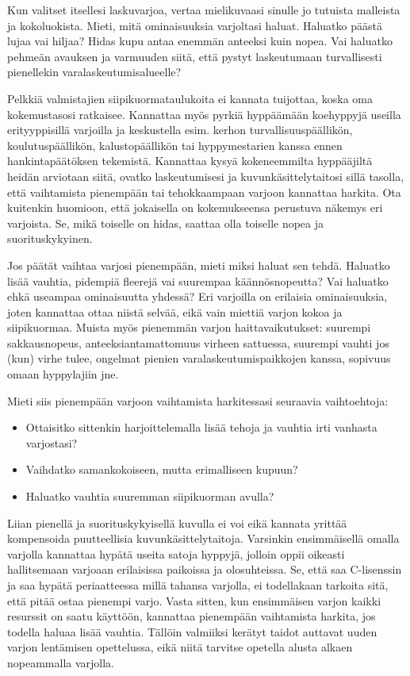 
Kun valitset itsellesi laskuvarjoa, vertaa mielikuvaasi sinulle jo tutuista malleista ja kokoluokista. Mieti, mitä ominaisuuksia varjoltasi haluat. Haluatko päästä lujaa vai hiljaa? Hidas kupu antaa enemmän anteeksi kuin nopea. Vai haluatko pehmeän avauksen ja varmuuden siitä, että pystyt laskeutumaan turvallisesti pienellekin varalaskeutumisalueelle? 


Pelkkiä valmistajien siipikuormataulukoita ei kannata tuijottaa, koska oma kokemustasosi ratkaisee. Kannattaa myös pyrkiä hyppäämään koehyppyjä useilla erityyppisillä varjoilla ja keskustella esim. kerhon turvallisuuspäällikön, koulutuspäällikön, kalustopäällikön tai hyppymestarien kanssa ennen hankintapäätöksen tekemistä. Kannattaa kysyä kokeneemmilta hyppääjiltä heidän arviotaan siitä, ovatko laskeutumisesi ja kuvunkäsittelytaitosi sillä tasolla, että vaihtamista pienempään tai tehokkaampaan varjoon kannattaa harkita. Ota kuitenkin huomioon, että jokaisella on kokemukseensa perustuva näkemys eri varjoista. Se, mikä toiselle on hidas, saattaa olla toiselle nopea ja suorituskykyinen. 


Jos päätät vaihtaa varjosi pienempään, mieti miksi haluat sen tehdä. Haluatko lisää vauhtia, pidempiä fleerejä vai suurempaa käännösnopeutta? Vai haluatko ehkä useampaa ominaisuutta yhdessä? Eri varjoilla on erilaisia ominaisuuksia, joten kannattaa ottaa niistä selvää, eikä vain miettiä varjon kokoa ja siipikuormaa. Muista myös pienemmän varjon haittavaikutukset: suurempi sakkausnopeus, anteeksiantamattomuus virheen sattuessa, suurempi vauhti jos (kun) virhe tulee, ongelmat pienien varalaskeutumispaikkojen kanssa, sopivuus omaan hyppylajiin jne. 


Mieti siis pienempään varjoon vaihtamista harkitessasi seuraavia vaihtoehtoja:  

\begin{itemize}
\item  Ottaisitko sittenkin harjoittelemalla lisää tehoja ja vauhtia irti vanhasta varjostasi? 
\item  Vaihdatko samankokoiseen, mutta erimalliseen kupuun? 
\item  Haluatko vauhtia suuremman siipikuorman avulla? 
\end{itemize}

Liian pienellä ja suorituskykyisellä kuvulla ei voi eikä kannata yrittää kompensoida puutteellisia kuvunkäsittelytaitoja. Varsinkin ensimmäisellä omalla varjolla kannattaa hypätä useita satoja hyppyjä, jolloin oppii oikeasti hallitsemaan varjoaan erilaisissa paikoissa ja olosuhteissa. Se, että saa C-lisenssin ja saa hypätä periaatteessa millä tahansa varjolla, ei todellakaan tarkoita sitä, että pitää ostaa pienempi varjo. Vasta sitten, kun ensimmäisen varjon kaikki resurssit on saatu käyttöön, kannattaa pienempään vaihtamista harkita, jos todella haluaa lisää vauhtia. Tällöin valmiiksi kerätyt taidot auttavat uuden varjon lentämisen opettelussa, eikä niitä tarvitse opetella alusta alkaen nopeammalla varjolla.  

